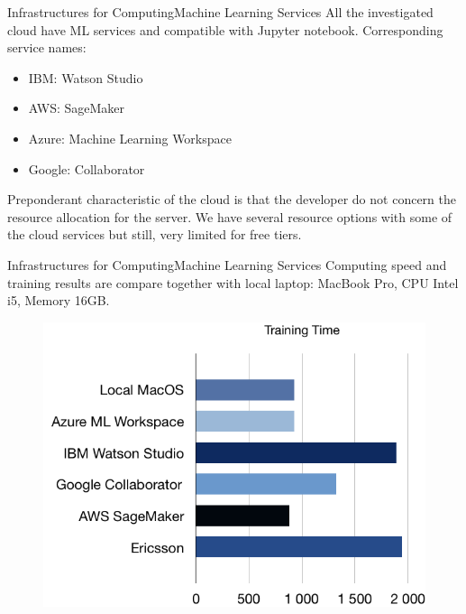 \documentclass{beamer}
\begin{document}
\begin{frame}{Infrastructures for Computing}{Machine Learning Services}
All the investigated cloud have ML services and compatible with Jupyter notebook. Corresponding service names:
\begin{itemize}
	\item IBM: Watson Studio
	\item AWS: SageMaker
	\item Azure: Machine Learning Workspace
	\item Google: Collaborator
\end{itemize}
Preponderant characteristic of the cloud is that the developer do not concern the resource allocation for the server.  We have several resource options with some of the cloud services but still, very limited for free tiers.
\end{frame}


\begin{frame}{Infrastructures for Computing}{Machine Learning Services}
Computing speed and training results are compare together with local laptop: MacBook Pro, CPU Intel i5, Memory 16GB.
\begin{minipage}[h]{0.48\linewidth}  
	\centering
\begin{figure}[h]
	\centering
	\includegraphics*[height=\linewidth]{Training_Time.png}
\end{figure}
\end{minipage}
\end{frame}
\end{document}
